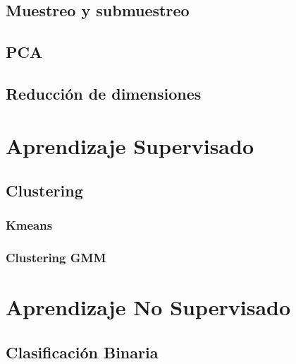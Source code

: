 \blindtext

\subsection{Muestreo y submuestreo}

\blindtext

\subsection{PCA}

\blindtext

\subsection{Reducción de dimensiones}

\blindtext

\section{Aprendizaje Supervisado}

\blindtext

\subsection{Clustering}

\blindtext

\subsubsection{Kmeans}

\blindtext

\subsubsection{Clustering GMM}

\blindtext

\section{Aprendizaje No Supervisado}

\blindtext

\subsection{Clasificación Binaria}

\blindtext

